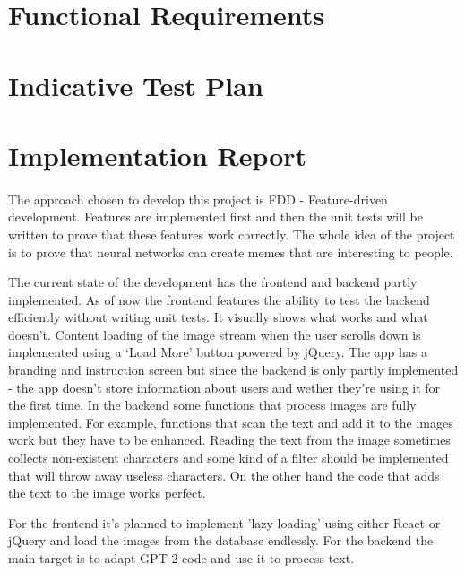\documentclass[12pt]{report}
\begin{document}
    \section*{Functional Requirements}
    \paragraph{}

    \section*{Indicative Test Plan}
    \paragraph{}

    \section*{Implementation Report}
    \paragraph{}

    The approach chosen to develop this project is FDD - Feature-driven development. Features are implemented first and then the unit tests will be written to prove that these features work correctly. The whole idea of the project is to prove that neural networks can create memes that are interesting to people.

    The current state of the development has the frontend and backend partly implemented. As of now the frontend features the ability to test the backend efficiently without writing unit tests. It visually shows what works and what doesn't. Content loading of the image stream when the user scrolls down is implemented using a `Load More' button powered by jQuery. The app has a branding and instruction screen but since the backend is only partly implemented - the app doesn't store information about users and wether they're using it for the first time.
    In the backend some functions that process images are fully implemented. For example, functions that scan the text and add it to the images work but they have to be enhanced. Reading the text from the image sometimes collects non-existent characters and some kind of a filter should be implemented that will throw away useless characters. On the other hand the code that adds the text to the image works perfect.

    For the frontend it's planned to implement 'lazy loading' using either React or jQuery and load the images from the database endlessly. 
    For the backend the main target is to adapt GPT-2 code and use it to process text.

    {}
    
\end{document}
